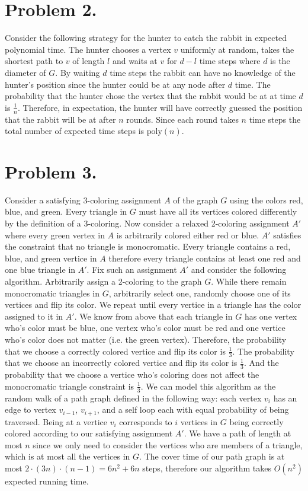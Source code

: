 \documentclass[12pt]{article}
\begin{document}
\section*{Problem 2.}
Consider the following strategy for the hunter to catch the rabbit in
expected polynomial time. The hunter chooses a vertex $v$ uniformly at random,
takes the shortest path to $v$ of length $l$ and waits at $v$ for $d-l$ time
steps where $d$ is the diameter of $G$. By waiting $d$ time steps the rabbit
can have no knowledge of the hunter's position since the hunter could be at any
node after $d$ time. The probability that the hunter chose the vertex that the
rabbit would be at at time $d$ is $\frac{1}{n}$. Therefore, in expectation, the
hunter will have correctly guessed the position that the rabbit will be at after
$n$ rounds. Since each round takes $n$ time steps the total number of expected
time steps is $\text{poly}(n)$.

\section*{Problem 3.}
Consider a satisfying 3-coloring assignment $A$ of the graph $G$ using the
colors red, blue, and green. Every triangle in $G$ must have all its vertices
colored differently by the definition of a 3-coloring. Now consider a relaxed
2-coloring assignment $A'$ where every green vertex in $A$ is arbitrarily
colored either red or blue. $A'$ satisfies the constraint that no triangle is
monocromatic. Every triangle contains a red, blue, and green vertice in $A$
therefore every triangle contains at least one red and one blue triangle in $A'$.
Fix such an assignment $A'$ and consider the following algorithm. Arbitrarily
assign a 2-coloring to the graph $G$. While there remain monocromatic triangles
in $G$, arbitrarily select one, randomly choose one of
its vertices and flip its color. We repeat until every vertice in a triangle has
the color assigned to it in $A'$. We know from above that each triangle in $G$
has one vertex who's color must be blue, one vertex who's color must be red and
one vertice who's color does not matter (i.e. the green vertex). Therefore, the
probability that we choose a correctly colored vertice and flip its color is
$\frac{1}{3}$. The probability that we choose an incorrectly colored vertice and
flip its color is $\frac{1}{3}$. And the probability that we choose a vertice
who's coloring does not affect the monocromatic triangle constraint is $\frac{1}{3}$.
We can model this algorithm as the random walk of a path graph defined in the
following way: each vertex $v_i$ has an edge to vertex $v_{i-1}$, $v_{i+1}$,
and a self loop each with equal probability of being traversed. Being at a
vertice $v_i$ corresponds to $i$ vertices in $G$ being correctly colored
according to our satisfying assignment $A'$. We have a path of length at most
$n$ since we only need to consider the vertices who are members of a triangle,
which is at most all the vertices in $G$. The cover time of our path graph is at
most $2\cdot(3n)\cdot(n-1) = 6n^2+6n$ steps, therefore our algorithm takes
$O(n^2)$ expected running time.
\end{document}
